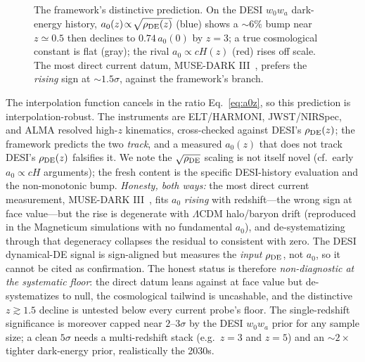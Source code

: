 \documentclass[aps,prd,twocolumn,10pt,nofootinbib,superscriptaddress]{revtex4-2}
\begin{document}
\begin{figure}[t]
\centering
{}
\caption{The framework's distinctive prediction. On the DESI $w_0w_a$ dark-energy history, $a_0(z)\!\propto\!
\sqrt{\rho_{\rm DE}(z)}$ (blue) shows a $\sim6\%$ bump near $z\!\simeq\!0.5$ then declines to $0.74\,a_0(0)$ by
$z\!=\!3$; a true cosmological constant is flat (gray); the rival $a_0\!\propto\!cH(z)$ (red) rises off scale. The
most direct current datum, MUSE-DARK III~\cite{Ciocan2026}, prefers the \emph{rising} sign at $\sim1.5\sigma$, against
the framework's branch.}
\label{fig:a0z}
\end{figure} The interpolation function cancels in the ratio
Eq.~\eqref{eq:a0z}, so this prediction is interpolation-robust. The instruments are ELT/HARMONI, JWST/NIRSpec, and
ALMA resolved high-$z$ kinematics, cross-checked against DESI's $\rho_{\rm DE}(z)$; the framework predicts the two
\emph{track}, and a measured $a_0(z)$ that does not track DESI's $\rho_{\rm DE}(z)$ falsifies it. We note the $\sqrt{\rho_{\rm DE}}$ scaling
is not itself novel (cf.\ early $a_0\!\propto\!cH$ arguments); the fresh content is the specific DESI-history
evaluation and the non-monotonic bump. \emph{Honesty, both ways:} the most direct current measurement,
MUSE-DARK III~\cite{Ciocan2026}, fits $a_0$ \emph{rising} with redshift---the wrong sign at face value---but the
rise is degenerate with $\Lambda$CDM halo/baryon drift (reproduced in the Magneticum simulations with no fundamental
$a_0$), and de-systematizing through that degeneracy collapses the residual to consistent with zero. The DESI
dynamical-DE signal is sign-aligned but measures the \emph{input} $\rho_{\rm DE}$, not $a_0$, so it cannot be cited
as confirmation. The honest status is therefore \emph{non-diagnostic at the systematic floor}: the direct datum
leans against at face value but de-systematizes to null, the cosmological tailwind is uncashable, and the
distinctive $z\!\gtrsim\!1.5$ decline is untested below every current probe's floor. The single-redshift
significance is moreover capped near $2$--$3\sigma$ by the DESI $w_0w_a$ prior for any sample size; a clean
$5\sigma$ needs a multi-redshift stack (e.g.\ $z\!=\!3$ and $z\!=\!5$) and an $\sim\!2\times$ tighter dark-energy
prior, realistically the 2030s.
\end{document}
